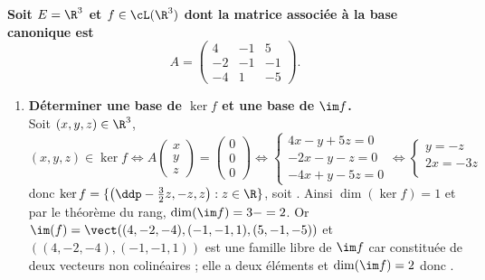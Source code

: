 \documentclass[a4paper, 11pt,reqno]{article}
\begin{document}
\begin{correction}  \;
	\textbf{Soit $E=\R^3$ et $f\in\cL(\R^3)$ dont la matrice associ\'ee \`a la base canonique est }
	$$A=\left(\begin{array}{rrr} 4&-1&5\\ -2&-1&-1\\ -4&1&-5 \end{array}\right).$$
	\begin{enumerate}
		\item \textbf{D\'eterminer une base de $\ker f$ et une base de $\im f$.}\\
		      Soit $(x,y,z) \in \R^3$,
		      $$ (x,y,z) \in \ker f \Longleftrightarrow A \left(\begin{array}{r} x \\ y \\ z \end{array} \right) = \left(\begin{array}{r} 0 \\ 0 \\ 0 \end{array} \right)
			      \Longleftrightarrow
			      \left\{ \begin{array}{l}
				      4x-y+5z = 0 \\
				      -2x-y-z = 0 \\
				      -4x+y-5z = 0
			      \end{array}\right.
			      \Longleftrightarrow
			      \left\{ \begin{array}{l}
				      y=-z    \\
				      2x= -3z \\
			      \end{array}\right.$$
		      donc $\ker f = \{ \left( \ddp -\frac{3}{2} z, -z , z \right) : z \in \R \}$, soit . Ainsi $\dim(\ker f)=1$ et par le th\'eor\`eme du rang, $\dim(\im f)=3-=2$. Or $\im(f) = \vect((4,-2,-4),(-1,-1,1),(5,-1,-5))$ et $((4,-2,-4),(-1,-1,1))$ est une famille libre de $\im f$ car constitu\'ee de deux vecteurs non colin\'eaires ; elle a deux \'el\'ements et $\dim(\im f)=2$ donc .

\end{enumerate}
\end{correction}
\end{document}
